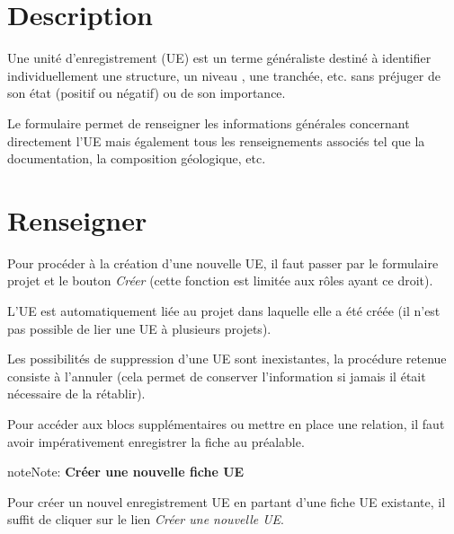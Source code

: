 \documentclass[letterpaper,10pt,french]{sphinxmanual}
\begin{document}
\section{Description}
\label{manuel/formulaire_ue:description}
Une unité d'enregistrement (UE) est un terme généraliste destiné à identifier individuellement une structure, un niveau , une tranchée, etc. sans préjuger de son état (positif ou négatif) ou de son importance.

Le formulaire permet de renseigner les informations générales concernant directement l'UE mais également tous les renseignements associés tel que la documentation, la composition géologique, etc.
\begin{figure}[htbp]
\centering

\end{figure}


\section{Renseigner}
\label{manuel/formulaire_ue:renseigner}
Pour procéder à la création d'une nouvelle UE, il faut passer par le formulaire projet et le bouton \emph{Créer} (cette fonction est limitée aux rôles ayant ce droit).

L'UE est automatiquement liée au projet dans laquelle elle a été créée (il n'est pas possible de lier une UE à plusieurs projets).

Les possibilités de suppression d'une UE sont inexistantes, la procédure retenue consiste à l'annuler (cela permet de conserver l'information si jamais il était nécessaire de la rétablir).

Pour accéder aux blocs supplémentaires ou mettre en place une relation, il faut avoir impérativement enregistrer la fiche au préalable.

\begin{notice}{note}{Note:}
\textbf{Créer une nouvelle fiche  UE}

Pour créer un nouvel enregistrement UE en partant d'une fiche UE existante, il suffit de cliquer sur le lien \emph{Créer une nouvelle UE}.
\end{notice}
\end{document}
